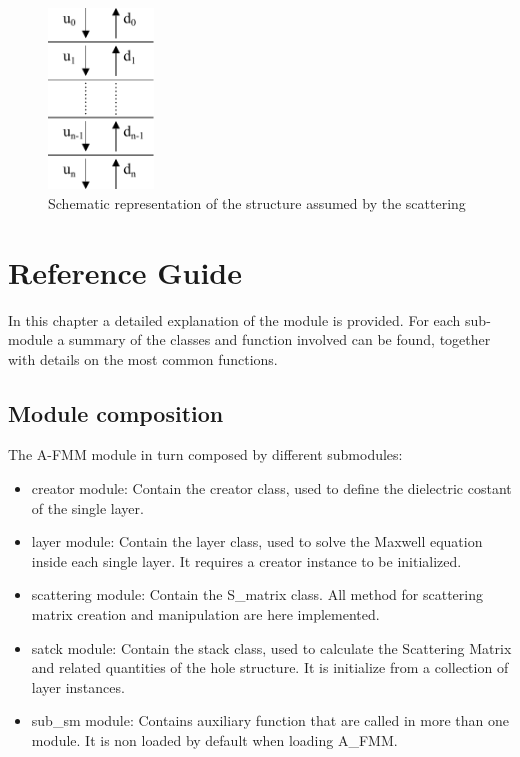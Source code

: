 \documentclass[a4paper,10pt]{report}
\begin{document}
\begin{figure}
\centering
\includegraphics[width=0.25\textwidth]{figures/multilayer.pdf}
\caption{Schematic representation of the structure assumed by the scattering }
\end{figure}






\chapter{Reference Guide}
In this chapter a detailed explanation of the module is provided. For each sub-module a summary of the classes and function involved can be found, together with details on the most common functions.
\section{Module composition}
The A-FMM module in turn composed by different submodules:
\begin{itemize}
\item creator module: Contain the creator class, used to define the dielectric costant of the single layer.   
\item layer module: Contain the layer class, used to solve the Maxwell equation inside each single layer. It requires a creator instance to be initialized.
\item scattering module: Contain the S\_matrix class. All method for scattering matrix creation and manipulation are here implemented.  
\item satck module: Contain the stack class, used to calculate the Scattering Matrix and related quantities of the hole structure. It is initialize from a collection of layer instances.
\item sub\_sm module: Contains auxiliary function that are called in more than one module. It is non loaded by default when loading A\_FMM.
\end{itemize}
\end{document}
